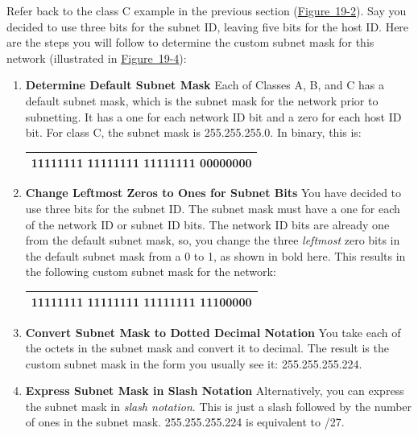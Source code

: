 \documentclass[b5paper,11pt]{memoir}
\begin{document}
Refer back to the class C example in the previous section
(\protect\hyperlink{ch19s02.htmlux5cux23example_of_class_c_subnetting_in_this_pa}{Figure~19-2}).
Say you decided to use three bits for the subnet ID, leaving five bits
for the host ID. Here are the steps you will follow to determine the
custom subnet mask for this network (illustrated in
\protect\hyperlink{ch19s03.htmlux5cux23determining_the_custom_subnet_mask_for_a}{Figure~19-4}):

\begin{enumerate}
\item
  {\textbf{Determine Default Subnet Mask}} Each of Classes A, B, and C
  has a default subnet mask, which is the subnet mask for the network
  prior to subnetting. It has a one for each network ID bit and a zero
  for each host ID bit. For class C, the subnet mask is 255.255.255.0.
  In binary, this is:

  \begin{longtable}[]{@{}l@{}}
  \toprule
  \endhead
  11111111 11111111 11111111 00000000\tabularnewline
  \bottomrule
  \end{longtable}
\item
  {\textbf{Change Leftmost Zeros to Ones for Subnet Bits}} You have
  decided to use three bits for the subnet ID. The subnet mask must have
  a one for each of the network ID or subnet ID bits. The network ID
  bits are already one from the default subnet mask, so, you change the
  three {\emph{leftmost}} zero bits in the default subnet mask from a 0
  to 1, as shown in bold here. This results in the following custom
  subnet mask for the network:

  \begin{longtable}[]{@{}l@{}}
  \toprule
  \endhead
  11111111 11111111 11111111 {\textbf{111}}00000\tabularnewline
  \bottomrule
  \end{longtable}
\item
  {\textbf{Convert Subnet Mask to Dotted Decimal Notation}} You take
  each of the octets in the subnet mask and convert it to decimal. The
  result is the custom subnet mask in the form you usually see it:
  255.255.255.224.
\item
  {\textbf{Express Subnet Mask in
  \protect\hypertarget{ch19s03.htmlux5cux23idx-CHP-19-0750}{}{}Slash
  Notation}} Alternatively, you can express the subnet mask in
  {\emph{slash notation}}. This is just a slash followed by the number
  of ones in the subnet mask. 255.255.255.224 is equivalent to /27.
\end{enumerate}
\end{document}
